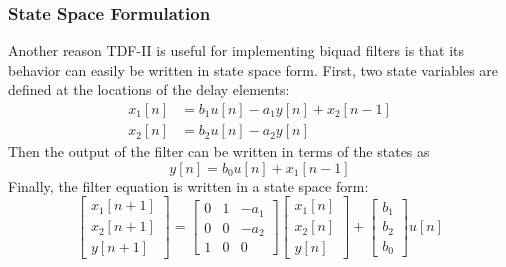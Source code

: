 \documentclass[twoside,a4paper]{article}
\begin{document}
\subsubsection{State Space Formulation}

Another reason TDF-II is useful for implementing biquad filters
is that its behavior can easily be written in state space form.
First, two state variables are defined at the locations of the
delay elements:
%
\begin{equation}
    \begin{split}
        x_1[n] &= b_1 u[n] - a_1 y[n] + x_2[n-1] \\
        x_2[n] &= b_2 u[n] - a_2 y[n]
    \end{split}
    \label{eq:bq_lin_states}
\end{equation}
%
Then the output of the filter can be written in terms of the states
as
%
\begin{equation}
    y[n] = b_0 u[n] + x_1[n-1]
    \label{eq:state_output_lin}
\end{equation}
%
Finally, the filter equation is written in a state space form:
%
\begin{equation}
    \begin{bmatrix} x_1[n+1] \\ x_2[n+1] \\ y[n+1] \end{bmatrix} =
    \begin{bmatrix} 0& 1& -a_1\\ 0& 0& -a_2\\ 1& 0& 0 \end{bmatrix}
    \begin{bmatrix} x_1[n] \\ x_2[n] \\ y[n] \end{bmatrix}
    + \begin{bmatrix} b_1\\ b_2\\ b_0 \end{bmatrix} u[n]
    \label{eq:bq_lin_state_spaces}
\end{equation}
\end{document}
